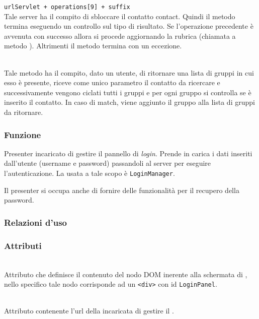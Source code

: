 \begin{description}
\verb|urlServlet + operations[9] + suffix|\\

Tale server ha il compito di sbloccare il contatto contact. Quindi il metodo termina eseguendo un controllo sul tipo di risultato. Se l'operazione precedente è avvenuta con successo allora si procede aggiornando la rubrica (chiamata a metodo ). Altrimenti il metodo termina con un eccezione.

\item{}\\
Tale metodo ha il compito, dato un utente, di ritornare una lista di gruppi in cui esso è presente, riceve come unico parametro il contatto da ricercare e successivamente vengono ciclati tutti i gruppi e per ogni gruppo si controlla se è inserito il contatto. In caso di match, viene aggiunto il gruppo alla lista di gruppi da ritornare.


\end{description}


\subsubsection*{Funzione}
Presenter incaricato di gestire il pannello di \textit{login}. Prende in carica i dati inseriti dall'utente (username e password) passandoli al server per eseguire l'autenticazione. La  usata a tale scopo è \texttt{LoginManager}.

Il presenter si occupa anche di fornire delle funzionalità per il recupero della password.

\subsubsection*{Relazioni d'uso}

\subsubsection*{Attributi}
\begin{description}

  \item{}\\
  Attributo che definisce il contenuto del nodo DOM inerente alla schermata di , nello specifico tale nodo corrisponde ad un \texttt{<div>} con id \texttt{LoginPanel}.
  \item{}\\
  Attributo contenente l'url della  incaricata di gestire il .

\end{description}

